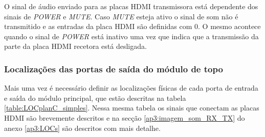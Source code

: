 O sinal de áudio enviado para as placas HDMI transmissora está dependente dos sinais de \textit{POWER} e \textit{MUTE}. Caso \textit{MUTE} esteja ativo o sinal de som não é transmitido e as entradas da placa HDMI são definidas com 0. O mesmo acontece quando o sinal de \textit{POWER} está inativo uma vez que indica que a transmissão da parte da placa HDMI recetora está desligada.

\subsubsection*{Localizações das portas de saída do módulo de topo} 

Mais uma vez é necessário definir as localizações físicas de cada porta de entrada e saída do módulo principal, que estão descritas na tabela \ref{table:LOCplanC_simples}. Nessa mesma tabela os sinais que conectam as placas HDMI são brevemente descritos e na secção \ref{ap3:imagem_som_RX_TX} do anexo \ref{ap3:LOCs} são descritos com mais detalhe.\\



